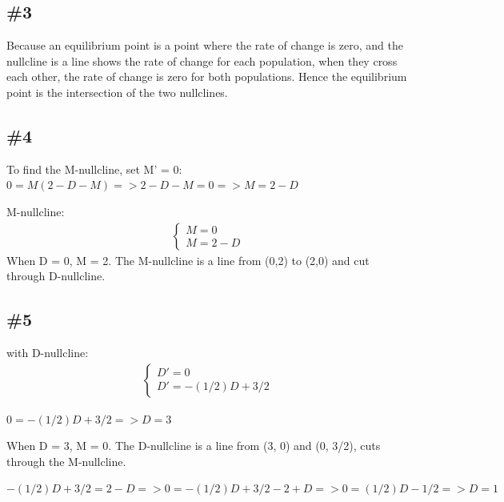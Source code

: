 \documentclass[12pt]{article}
\begin{document}
\subsection*{\#3}
Because an equilibrium point is a point where the rate of change is zero, and the nullcline is a line shows the rate of change for each population, when they cross each other, the rate of change is zero for both populations. Hence the equilibrium point is the intersection of the two nullclines.
\subsection*{\#4}
To find the M-nullcline, set M' = 0:
$0 = M(2 - D - M) => 2 - D - M = 0 => M = 2 - D$

M-nullcline:
\begin{align*}
    \begin{cases}
    M = 0 \\
    M = 2 - D
    \end{cases}
\end{align*}
When D = 0, M = 2. The M-nullcline is a line from (0,2) to (2,0) and cut through D-nullcline.


\subsection*{\#5}
with D-nullcline:
\begin{align*}
    \begin{cases}
    D' = 0 \\
    D' = -(1/2)D + 3/2
    \end{cases}
\end{align*}

$0 = -(1/2)D + 3/2 => D = 3$

When D = 3, M = 0. The D-nullcline is a line from (3, 0) and (0, 3/2), cuts through the M-nullcline.

$-(1/2)D + 3/2 = 2 - D => 0 = -(1/2)D + 3/2 - 2 + D => 0 = (1/2)D - 1/2 => D = 1$
\end{document}
